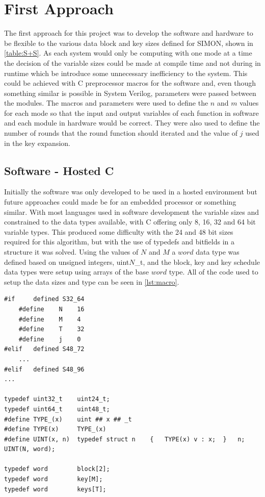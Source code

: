 \documentclass[12pt,twoside,a4paper]{report}
\begin{document}
	\section{First Approach}
	\label{section:first}
	The first approach for this project was to develop the software and hardware to be flexible to the various data block and key sizes defined for SIMON, shown in \autoref{table:S+S}. As each system would only be computing with one mode at a time the decision of the variable sizes could be made at compile time and not during in runtime which be introduce some unnecessary inefficiency to the system. This could be achieved with C preprocessor macros for the software and, even though something similar is possible in System Verilog, parameters were passed between the modules. The macros and parameters were used to define the $n$ and $m$ values for each mode so that the input and output variables of each function in software and each module in hardware would be correct. They were also used to define the number of rounds that the round function should iterated and the value of $j$ used in the key expansion.
    
	\subsection{Software - Hosted C}
	\label{subsection:HOSTED1}
	Initially the software was only developed to be used in a hosted environment but future approaches could made be for an embedded processor or something similar. With most languages used in software development the variable sizes and constrained to the data types available, with C offering only 8, 16, 32 and 64 bit variable types. This produced some difficulty with the 24 and 48 bit sizes required for this algorithm, but with the use of typedefs and bitfields in a structure it was solved. Using the values of $N$ and $M$ a $word$ data type was defined based on unsigned integers, uint$N$\_t, and the block, key and key schedule data types were setup using arrays of the base $word$ type. All of the code used to setup the data sizes and type can be seen in \autoref{lst:macro}.
    
	\begin{lstlisting}[label={lst:macro},caption={Macro definition of the word, block, key and key schedule types.},style=CStyle]
#if		defined	S32_64
    #define    N    16
    #define    M    4
    #define    T    32
    #define    j    0
#elif	defined S48_72
    ...
#elif	defined S48_96
...

typedef uint32_t	uint24_t;
typedef uint64_t	uint48_t;
#define TYPE_(x)	uint ## x ## _t
#define TYPE(x)		TYPE_(x)
#define UINT(x, n)	typedef struct n	{	TYPE(x) v : x;	}	n;
UINT(N, word);

typedef word 		block[2];
typedef word 		key[M];
typedef word		keys[T];
	\end{lstlisting}
    
\end{document}
